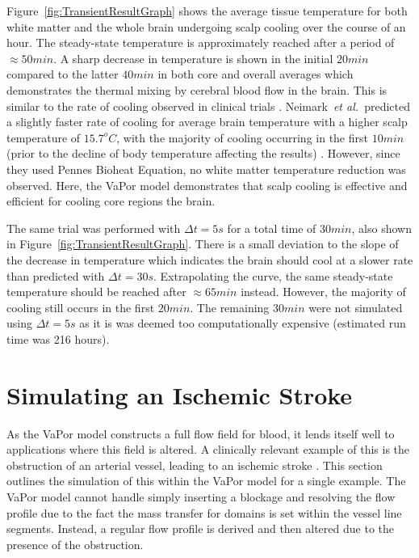\documentclass[11pt,english,a4paper,twoside,openright]{report}
\begin{document}
{{{{{{{Figure~\ref{fig:TransientResultGraph} shows the average tissue temperature for both white matter and the whole brain undergoing scalp cooling over the course of an hour. The steady-state temperature is approximately reached after a period of ${\approx}50min$. A sharp decrease in temperature is shown in the initial $20min$ compared to the latter $40min$ in both core and overall averages which demonstrates the thermal mixing by cerebral blood flow in the brain. This is similar to the rate of cooling observed in clinical trials \cite{harris2008forced}. Neimark~\textit{et al.\ }predicted a slightly faster rate of cooling for average brain temperature with a higher scalp temperature of $15.7^{o}C$, with the majority of cooling occurring in the first $10min$ (prior to the decline of body temperature affecting the results) \cite{neimark2008brain}. However, since they used Pennes Bioheat Equation, no white matter temperature reduction was observed. Here, the VaPor model demonstrates that scalp cooling is effective and efficient for cooling core regions the brain. 

The same trial was performed with $\Delta t=5s$ for a total time of $30min$, also shown in Figure~\ref{fig:TransientResultGraph}. There is a small deviation to the slope of the decrease in temperature which indicates the brain should cool at a slower rate than predicted with $\Delta t=30s$. Extrapolating the curve, the same steady-state temperature should be reached after ${\approx}65min$ instead. However, the majority of cooling still occurs in the first $20min$. The remaining $30min$ were not simulated using $\Delta t=5s$ as it is was deemed too computationally expensive (estimated run time was 216 hours). 

\section[Simulating an Ischemic Stroke]{{\Large S}imulating an {\Large I}schemic {\Large S}troke}
\label{Sec:5StrokeSimulation}

As the VaPor model constructs a full flow field for blood, it lends itself well to applications where this field is altered. A clinically relevant example of this is the obstruction of an arterial vessel, leading to an ischemic stroke \cite{rovira2005distribution}. This section outlines the simulation of this within the VaPor model for a single example. The VaPor model cannot handle simply inserting a blockage and resolving the flow profile due to the fact the mass transfer for domains is set within the vessel line segments. Instead, a regular flow profile is derived and then altered due to the presence of the obstruction.

}}}}}}}
\end{document}
